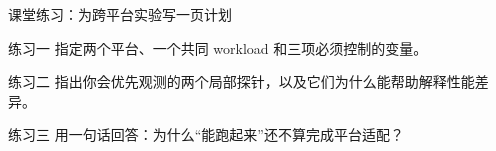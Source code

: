 \begin{frame}{课堂练习：为跨平台实验写一页计划}
  \begin{block}{练习一}
    指定两个平台、一个共同 workload 和三项必须控制的变量。
  \end{block}
  \pause
  \begin{block}{练习二}
    指出你会优先观测的两个局部探针，以及它们为什么能帮助解释性能差异。
  \end{block}
  \pause
  \begin{block}{练习三}
    用一句话回答：为什么“能跑起来”还不算完成平台适配？
  \end{block}
\end{frame}
